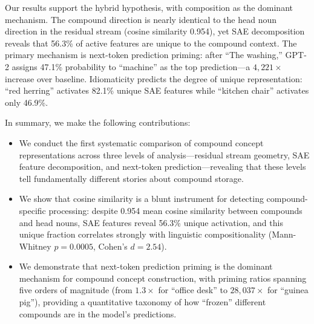 Our results support the hybrid hypothesis, with composition as the dominant mechanism.
The compound direction is nearly identical to the head noun direction in the residual stream (cosine similarity 0.954), yet SAE decomposition reveals that 56.3\% of active features are unique to the compound context.
The primary mechanism is next-token prediction priming: after ``The washing,'' GPT-2 assigns 47.1\% probability to ``machine'' as the top prediction---a $4{,}221\times$ increase over baseline.
Idiomaticity predicts the degree of unique representation: ``red herring'' activates 82.1\% unique SAE features while ``kitchen chair'' activates only 46.9\%.

In summary, we make the following contributions:
\begin{itemize}[leftmargin=*,itemsep=0pt,topsep=0pt]
    \item We conduct the first systematic comparison of compound concept representations across three levels of analysis---residual stream geometry, SAE feature decomposition, and next-token prediction---revealing that these levels tell fundamentally different stories about compound storage.
    \item We show that cosine similarity is a blunt instrument for detecting compound-specific processing: despite 0.954 mean cosine similarity between compounds and head nouns, SAE features reveal 56.3\% unique activation, and this unique fraction correlates strongly with linguistic compositionality (Mann-Whitney $p = 0.0005$, Cohen's $d = 2.54$).
    \item We demonstrate that next-token prediction priming is the dominant mechanism for compound concept construction, with priming ratios spanning five orders of magnitude (from $1.3\times$ for ``office desk'' to $28{,}037\times$ for ``guinea pig''), providing a quantitative taxonomy of how ``frozen'' different compounds are in the model's predictions.
\end{itemize}
